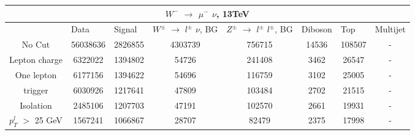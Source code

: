 \documentclass[10pt]{article}
\begin{document}
 										
\begin{center}										
\begin{table}[H] 										
\begin{adjustbox}{width=1\textwidth}								
\begin{tabular}{cccccccc} 									
\\ \hline \hline  										
\multicolumn{8}{c}{$W^{-}$ $\rightarrow$ $\mu^{-}$ $\nu$, 13TeV}  									
\\ \hline \hline                            						
\multicolumn{1}{|c|}{}   & \multicolumn{1}{l|}{Data} & \multicolumn{1}{l|}{Signal} & \multicolumn{1}{l|}{$W^{\pm}$ $\rightarrow$ $l^{\pm}$ $\nu$, BG} & \multicolumn{1}{l|}{$Z^{\pm}$ $\rightarrow$ $l^{\pm}$ $l^{\pm}$, BG} & \multicolumn{1}{l|}{Diboson} & \multicolumn{1}{l|}{Top} & \multicolumn{1}{l|}{Multijet} \\ \hline 
\multicolumn{1}{|c|}{No Cut}  & \multicolumn{1}{c|}{56038636} & \multicolumn{1}{c|}{2826855} & \multicolumn{1}{c|}{4303739} & \multicolumn{1}{c|}{756715} & \multicolumn{1}{c|}{14536} & \multicolumn{1}{c|}{108507} & \multicolumn{1}{c|}{-}  \\ \hline 
\multicolumn{1}{|c|}{Lepton charge}  & \multicolumn{1}{c|}{6322022} & \multicolumn{1}{c|}{1394802} & \multicolumn{1}{c|}{54726} & \multicolumn{1}{c|}{241408} & \multicolumn{1}{c|}{3462} & \multicolumn{1}{c|}{26547} & \multicolumn{1}{c|}{-}  \\ \hline 
\multicolumn{1}{|c|}{One lepton}  & \multicolumn{1}{c|}{6177156} & \multicolumn{1}{c|}{1394622} & \multicolumn{1}{c|}{54696} & \multicolumn{1}{c|}{116759} & \multicolumn{1}{c|}{3102} & \multicolumn{1}{c|}{25005} & \multicolumn{1}{c|}{-}  \\ \hline 
\multicolumn{1}{|c|}{trigger}  & \multicolumn{1}{c|}{6030926} & \multicolumn{1}{c|}{1217641} & \multicolumn{1}{c|}{47809} & \multicolumn{1}{c|}{103484} & \multicolumn{1}{c|}{2702} & \multicolumn{1}{c|}{21515} & \multicolumn{1}{c|}{-}  \\ \hline 
\multicolumn{1}{|c|}{Isolation}  & \multicolumn{1}{c|}{2485106} & \multicolumn{1}{c|}{1207703} & \multicolumn{1}{c|}{47191} & \multicolumn{1}{c|}{102570} & \multicolumn{1}{c|}{2661} & \multicolumn{1}{c|}{19931} & \multicolumn{1}{c|}{-}  \\ \hline 
\multicolumn{1}{|c|}{$p_{T}^{l}$ $>$ 25 GeV}  & \multicolumn{1}{c|}{1567241} & \multicolumn{1}{c|}{1066867} & \multicolumn{1}{c|}{28707} & \multicolumn{1}{c|}{82479} & \multicolumn{1}{c|}{2375} & \multicolumn{1}{c|}{17998} & \multicolumn{1}{c|}{-}  \\ \hline 

\end{tabular}
\end{adjustbox}
\end{table}
\end{center}
\end{document}
